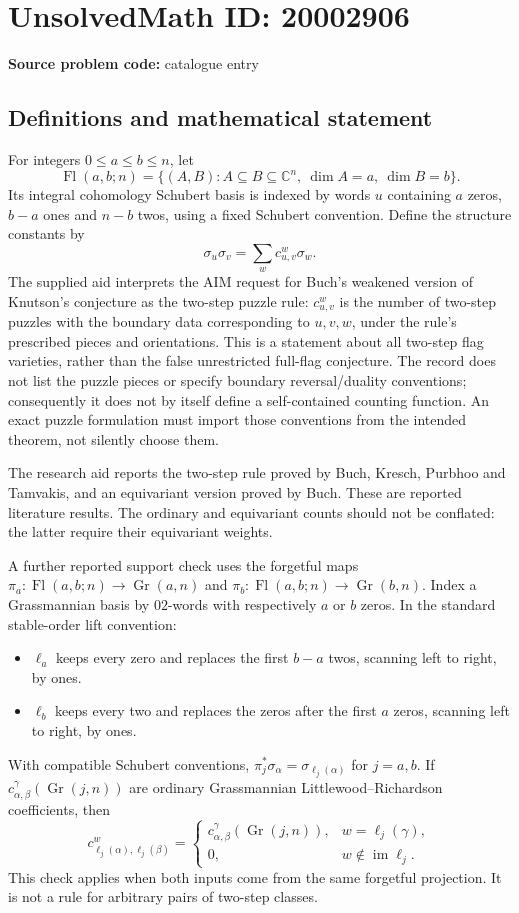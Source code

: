\documentclass[11pt]{article}
\newcommand{\C}{\mathbb{C}}
\begin{document}
\section*{UnsolvedMath ID: 20002906}
\textbf{Source problem code:} catalogue entry
\subsection{Definitions and mathematical statement}
For integers \(0\le a\le b\le n\), let
\[
\operatorname{Fl}(a,b;n)=\{(A,B):A\subseteq B\subseteq\C^n,\ \dim A=a,\ \dim B=b\}.
\]
Its integral cohomology Schubert basis is indexed by words \(u\) containing \(a\) zeros, \(b-a\) ones and \(n-b\) twos, using a fixed Schubert convention. Define the structure constants by
\[
\sigma_u\sigma_v=\sum_w c_{u,v}^{w}\sigma_w.
\]
The supplied aid interprets the AIM request for Buch's weakened version of Knutson's conjecture as the two-step puzzle rule: \(c_{u,v}^{w}\) is the number of two-step puzzles with the boundary data corresponding to \(u,v,w\), under the rule's prescribed pieces and orientations. This is a statement about all two-step flag varieties, rather than the false unrestricted full-flag conjecture. The record does not list the puzzle pieces or specify boundary reversal/duality conventions; consequently it does not by itself define a self-contained counting function. An exact puzzle formulation must import those conventions from the intended theorem, not silently choose them.

The research aid reports the two-step rule proved by Buch, Kresch, Purbhoo and Tamvakis, and an equivariant version proved by Buch. These are reported literature results. The ordinary and equivariant counts should not be conflated: the latter require their equivariant weights.

A further reported support check uses the forgetful maps \(\pi_a:\operatorname{Fl}(a,b;n)\to\operatorname{Gr}(a,n)\) and \(\pi_b:\operatorname{Fl}(a,b;n)\to\operatorname{Gr}(b,n)\). Index a Grassmannian basis by \(02\)-words with respectively \(a\) or \(b\) zeros. In the standard stable-order lift convention:
\begin{itemize}
\item \(\ell_a\) keeps every zero and replaces the first \(b-a\) twos, scanning left to right, by ones.
\item \(\ell_b\) keeps every two and replaces the zeros after the first \(a\) zeros, scanning left to right, by ones.
\end{itemize}
With compatible Schubert conventions, \(\pi_j^*\sigma_\alpha=\sigma_{\ell_j(\alpha)}\) for \(j=a,b\). If \(c_{\alpha,\beta}^{\gamma}(\operatorname{Gr}(j,n))\) are ordinary Grassmannian Littlewood--Richardson coefficients, then
\[
c_{\ell_j(\alpha),\ell_j(\beta)}^{w}=
\begin{cases}
c_{\alpha,\beta}^{\gamma}(\operatorname{Gr}(j,n)),&w=\ell_j(\gamma),\\
0,&w\notin\operatorname{im}\ell_j.
\end{cases}
\]
This check applies when both inputs come from the same forgetful projection. It is not a rule for arbitrary pairs of two-step classes.
\end{document}
